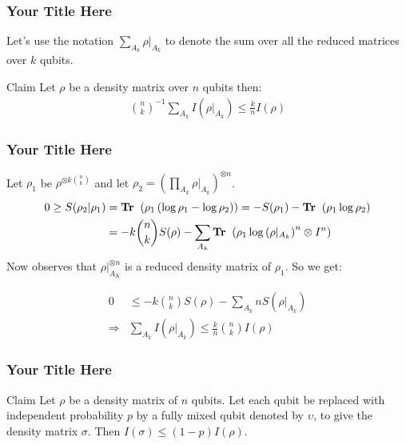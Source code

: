 \documentclass{beamer}
\begin{document}
\begin{frame}
  \frametitle{Your Title Here}
  Let's use the notation $\sum_{A_k}\rho|_{A_k}$ to denote the sum over all the reduced matrices over $k$ qubits.  
\begin{block}{Claim}
  Let $\rho$ be a density matrix over $n$ qubits then:  
  \begin{equation*}
    \begin{split}
      { n \choose k }^{-1}\sum_{A_k} I(\rho|_{A_k}) \le \frac{k}{n}I(\rho)
    \end{split}
  \end{equation*}
\end{block}
\end{frame}
\begin{frame}
  \frametitle{Your Title Here}
Let $\rho_{1}$ be $\rho^{\otimes k { n \choose k } }$ and let $\rho_{2} = \left( \prod_{A_{k}} \rho |_{A_{k}} \right)^{\otimes n}$.  
  \begin{equation*}
    \begin{split}
      0 \ge S(\rho_{2} | \rho_{1} ) &= \textbf{Tr } \left( \rho_{1} \left( \log \rho_{1} - \log \rho_{2} \right) \right) = -S(\rho_{1}) - \textbf{Tr } \left( \rho_{1} \log \rho_{2} \right) \\ 
      &= -k { n \choose k } S(\rho) - \sum_{A_k} \textbf{Tr } \left( \rho_{1} \log \left( \rho|_{A_{k}} \right)^n \otimes I^n \right)
    \end{split}
  \end{equation*}
  Now observes that $ \rho|_{A_{K}}^{\otimes n} $ is a reduced density matrix of $\rho_{1}$. So we get: 

  \begin{equation*}
    \begin{split}
      0 & \le  -k { n \choose k } S(\rho) - \sum_{A_k} n S\left( \rho |_{A_{k}} \right) \\ 
      \Rightarrow  & \sum_{A_{k}}I\left( \rho|_{A_{k}} \right)\le \frac{k}{n}{ n \choose k } I\left( \rho \right)
    \end{split}
  \end{equation*}
\end{frame}

\begin{frame}
  \frametitle{Your Title Here}
\begin{block}{Claim}
  Let $\rho$ be a density matrix of $n$ qubits. Let each qubit be replaced with independent probability $p$ by a fully mixed qubit denoted by $\upsilon$, to give the density matrix $\sigma$. Then $I\left( \sigma \right) \le \left( 1 - p  \right) I \left( \rho \right)$. 
\end{block}
\end{frame}
\end{document}
